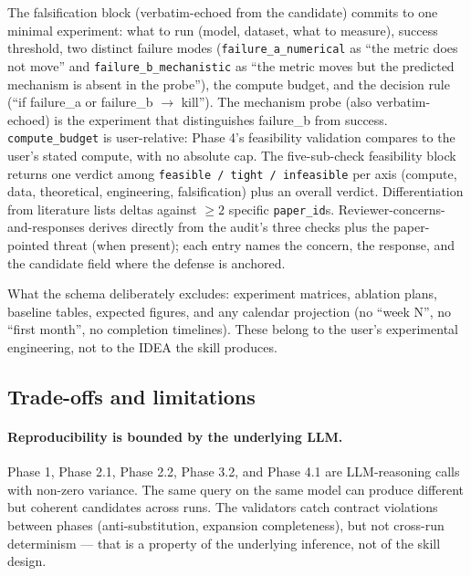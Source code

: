 \documentclass[10pt,a4paper]{article}
\begin{document}
The falsification block (verbatim-echoed from the candidate) commits to one minimal experiment: what to run (model, dataset, what to measure), success threshold, two distinct failure modes (\texttt{failure\_a\_numerical} as ``the metric does not move'' and \texttt{failure\_b\_mechanistic} as ``the metric moves but the predicted mechanism is absent in the probe''), the compute budget, and the decision rule (``if failure\_a or failure\_b $\to$ kill''). The mechanism probe (also verbatim-echoed) is the experiment that distinguishes failure\_b from success. \texttt{compute\_budget} is user-relative: Phase 4's feasibility validation compares to the user's stated compute, with no absolute cap. The five-sub-check feasibility block returns one verdict among \texttt{feasible / tight / infeasible} per axis (compute, data, theoretical, engineering, falsification) plus an overall verdict. Differentiation from literature lists deltas against $\geq 2$ specific \texttt{paper\_id}s. Reviewer-concerns-and-responses derives directly from the audit's three checks plus the paper-pointed threat (when present); each entry names the concern, the response, and the candidate field where the defense is anchored.

What the schema deliberately excludes: experiment matrices, ablation plans, baseline tables, expected figures, and any calendar projection (no ``week N'', no ``first month'', no completion timelines). These belong to the user's experimental engineering, not to the IDEA the skill produces.

\subsection{Trade-offs and limitations}
\label{subsec:skill-tradeoffs}

\paragraph{Reproducibility is bounded by the underlying LLM.} Phase 1, Phase 2.1, Phase 2.2, Phase 3.2, and Phase 4.1 are LLM-reasoning calls with non-zero variance. The same query on the same model can produce different but coherent candidates across runs. The validators catch contract violations between phases (anti-substitution, expansion completeness), but not cross-run determinism --- that is a property of the underlying inference, not of the skill design.
\end{document}
